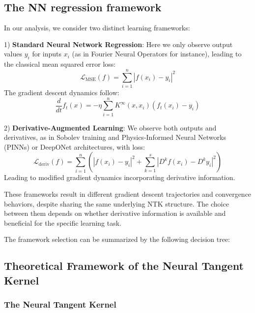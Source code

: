 \documentclass[a4paper]{article}
\begin{document}
\subsection{The NN regression framework}

In our analysis, we consider two distinct learning frameworks:

1) \textbf{Standard Neural Network Regression}: Here we only observe output values $y_i$ for inputs $x_i$ (as in Fourier Neural Operators for instance), leading to the classical mean squared error loss:
$$\mathcal{L}_{\text{MSE}}(f) = \sum_{i=1}^n |f(x_i) - y_i|^2$$
The gradient descent dynamics follow:
$$\frac{d}{dt}f_t(x) = -\eta \sum_{i=1}^n K^{\infty}(x,x_i)(f_t(x_i) - y_i)$$

2) \textbf{Derivative-Augmented Learning}: We observe both outputs and derivatives, as in Sobolev training and Physics-Informed Neural Networks (PINNs) or DeepONet architectures, with loss:
$$\mathcal{L}_{\text{deriv}}(f) = \sum_{i=1}^n \left(|f(x_i) - y_i|^2 + \sum_{k=1}^s |D^k f(x_i) - D^k y_i|^2\right)$$
Leading to modified gradient dynamics incorporating derivative information.

These frameworks result in different gradient descent trajectories and convergence behaviors, despite sharing the same underlying NTK structure. The choice between them depends on whether derivative information is available and beneficial for the specific learning task.

The framework selection can be summarized by the following decision tree:





\subsection{Theoretical Framework of the Neural Tangent Kernel}

\subsubsection{The Neural Tangent Kernel}
\end{document}
